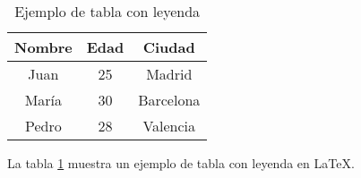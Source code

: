 \documentclass{article}
\begin{document}
\begin{table}[h]
\centering
\begin{tabular}{|c|c|c|}
\hline
Nombre & Edad & Ciudad \\
\hline
Juan & 25 & Madrid \\
María & 30 & Barcelona \\
Pedro & 28 & Valencia \\
\hline
\end{tabular}
\caption{Ejemplo de tabla con leyenda}
\label{tab:leyenda}
\end{table}
La tabla \ref{tab:leyenda} muestra un ejemplo de tabla con leyenda en LaTeX.
\end{document}
